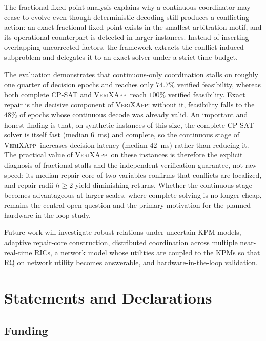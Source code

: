 \documentclass[pdflatex,sn-mathphys-num,iicol,oneside]{sn-jnl}
\newcommand{\method}{\textsc{VeriXApp}}
\begin{document}
The fractional-fixed-point analysis explains why a continuous
coordinator may cease to evolve even though deterministic decoding
still produces a conflicting action: an exact fractional fixed point
exists in the smallest arbitration motif, and its operational
counterpart is detected in larger instances. Instead of inserting
overlapping uncorrected factors, the framework extracts the
conflict-induced subproblem and delegates it to an exact solver under
a strict time budget.

The evaluation demonstrates that continuous-only coordination stalls
on roughly one quarter of decision epochs and reaches only $74.7\%$
verified feasibility, whereas both complete CP-SAT and \method\ reach
$100\%$ verified feasibility. Exact repair is the decisive component
of \method: without it, feasibility falls to the $48\%$ of epochs
whose continuous decode was already valid. An important and honest
finding is that, on synthetic instances of this size, the complete
CP-SAT solver is itself fast (median $6$~ms) and complete, so the
continuous stage of \method\ increases decision latency (median
$42$~ms) rather than reducing it. The practical value of \method\ on
these instances is therefore the explicit diagnosis of fractional
stalls and the independent verification guarantee, not raw speed; its
median repair core of two variables confirms that conflicts are
localized, and repair radii $h \geq 2$ yield diminishing returns.
Whether the continuous stage becomes advantageous at larger scales,
where complete solving is no longer cheap, remains the central open
question and the primary motivation for the planned
hardware-in-the-loop study.

Future work will investigate robust relations under uncertain KPM
models, adaptive repair-core construction, distributed coordination
across multiple near-real-time RICs, a network model whose utilities
are coupled to the KPMs so that RQ on network utility becomes
answerable, and hardware-in-the-loop validation.

\section*{Statements and Declarations}

\subsection*{Funding}
\end{document}
